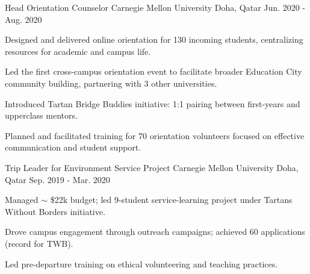 

\begin{cventries}

  \cventry
    {Head Orientation Counselor} %
    {Carnegie Mellon University} %
    {Doha, Qatar} %
    {Jun. 2020 - Aug. 2020} %
    {
      \begin{cvitems} %
        \item {Designed and delivered online orientation for 130 incoming students, centralizing resources for academic and campus life.}
        \item {Led the first cross-campus orientation event to facilitate broader Education City community building, partnering with 3 other universities.}
        \item {Introduced Tartan Bridge Buddies initiative: 1:1 pairing between first-years and upperclass mentors.}
        \item {Planned and facilitated training for 70 orientation volunteers focused on effective communication and student support.}
      \end{cvitems}
    }

  \cventry
    {Trip Leader for Environment Service Project} %
    {Carnegie Mellon University} %
    {Doha, Qatar} %
    {Sep. 2019 - Mar. 2020} %
    {
      \begin{cvitems} %
        \item {Managed $\sim$ \$22k budget; led 9-student service-learning project under Tartans Without Borders initiative.}
        \item {Drove campus engagement through outreach campaigns; achieved 60 applications (record for TWB).}
        \item {Led pre-departure training on ethical volunteering and teaching practices.}
      \end{cvitems}
    }


\end{cventries}
